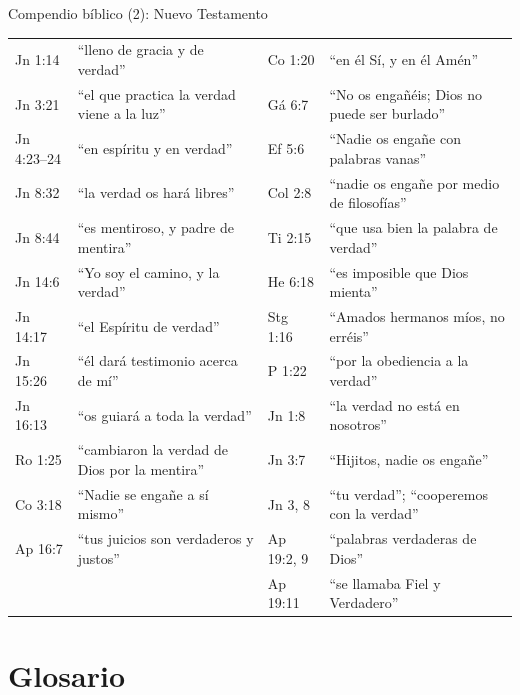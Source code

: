 \begin{frame}{Compendio bíblico (2): Nuevo Testamento}
\fontsize{6.2}{7.4}\selectfont\renewcommand{\arraystretch}{1.06}
\begin{tabular}{@{}>{\RaggedRight\arraybackslash}p{1.5cm}>{\RaggedRight\arraybackslash}p{4.4cm}|>{\RaggedRight\arraybackslash}p{1.5cm}>{\RaggedRight\arraybackslash}p{4.4cm}@{}}
\toprule
Jn 1:14 & ``lleno de gracia y de verdad'' & 2 Co 1:20 & ``en él Sí, y en él Amén'' \\
Jn 3:21 & ``el que practica la verdad viene a la luz'' & Gá 6:7 & ``No os engañéis; Dios no puede ser burlado'' \\
Jn 4:23--24 & ``en espíritu y en verdad'' & Ef 5:6 & ``Nadie os engañe con palabras vanas'' \\
Jn 8:32 & ``la verdad os hará libres'' & Col 2:8 & ``nadie os engañe por medio de filosofías'' \\
Jn 8:44 & ``es mentiroso, y padre de mentira'' & 2 Ti 2:15 & ``que usa bien la palabra de verdad'' \\
Jn 14:6 & ``Yo soy el camino, y la verdad'' & He 6:18 & ``es imposible que Dios mienta'' \\
Jn 14:17 & ``el Espíritu de verdad'' & Stg 1:16 & ``Amados hermanos míos, no erréis'' \\
Jn 15:26 & ``él dará testimonio acerca de mí'' & 1 P 1:22 & ``por la obediencia a la verdad'' \\
Jn 16:13 & ``os guiará a toda la verdad'' & 1 Jn 1:8 & ``la verdad no está en nosotros'' \\
Ro 1:25 & ``cambiaron la verdad de Dios por la mentira'' & 1 Jn 3:7 & ``Hijitos, nadie os engañe'' \\
1 Co 3:18 & ``Nadie se engañe a sí mismo'' & 3 Jn 3, 8 & ``tu verdad''; ``cooperemos con la verdad'' \\
Ap 16:7 & ``tus juicios son verdaderos y justos'' & Ap 19:2, 9 & ``palabras verdaderas de Dios'' \\
 & & Ap 19:11 & ``se llamaba Fiel y Verdadero'' \\
\bottomrule
\end{tabular}
\end{frame}

\section{Glosario}

